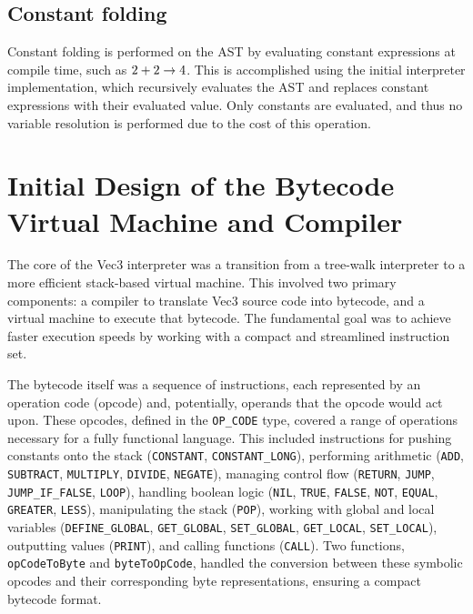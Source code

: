 \subsection{Constant folding}\label{subsec:constant-folding}

Constant folding is performed on the AST by evaluating constant expressions at compile time, such as $2 + 2 \rightarrow 4$.
This is accomplished using the initial interpreter implementation, which recursively evaluates the AST and replaces
constant expressions with their evaluated value.
Only constants are evaluated, and thus no variable resolution is performed due to the cost of this operation.

\section{Initial Design of the Bytecode Virtual Machine and Compiler}\label{sec:initial-design-of-the-bytecode-virtual-machine-and-compiler}

The core of the Vec3 interpreter was a transition from a tree-walk interpreter to a more efficient stack-based virtual machine. 
This involved two primary components: a compiler to translate Vec3 source code into bytecode, and a virtual machine to execute that bytecode. 
The fundamental goal was to achieve faster execution speeds by working with a compact and streamlined instruction set.

The bytecode itself was a sequence of instructions, each represented by an operation code (opcode) and, potentially, operands that the opcode would act upon. 
These opcodes, defined in the \texttt{OP\_CODE} type, covered a range of operations necessary for a fully functional language. 
This included instructions for pushing constants onto the stack (\texttt{CONSTANT}, \texttt{CONSTANT\_LONG}), performing arithmetic (\texttt{ADD}, \texttt{SUBTRACT}, \texttt{MULTIPLY}, \texttt{DIVIDE}, \texttt{NEGATE}), managing control flow (\texttt{RETURN}, \texttt{JUMP}, \texttt{JUMP\_IF\_FALSE}, \texttt{LOOP}), handling boolean logic (\texttt{NIL}, \texttt{TRUE}, \texttt{FALSE}, \texttt{NOT}, \texttt{EQUAL}, \texttt{GREATER}, \texttt{LESS}), manipulating the stack (\texttt{POP}), working with global and local variables (\texttt{DEFINE\_GLOBAL}, \texttt{GET\_GLOBAL}, \texttt{SET\_GLOBAL}, \texttt{GET\_LOCAL}, \texttt{SET\_LOCAL}), outputting values (\texttt{PRINT}), and calling functions (\texttt{CALL}). Two functions, \texttt{opCodeToByte} and \texttt{byteToOpCode}, handled the conversion between these symbolic opcodes and their corresponding byte representations, ensuring a compact bytecode format.

